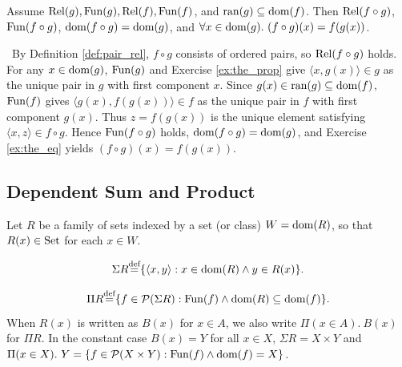 \documentclass[10pt,a4paper]{article}
\begin{document}
\begin{lemma}\label{lem:fun_comp}
Assume ${\textrm{Rel}}(g), {\textrm{Fun}}(g), {\textrm{Rel}}(f), {\textrm{Fun}}(f)$, and ${\textrm{ran}}(g) \subseteq {\textrm{dom}}(f)$. Then ${\textrm{Rel}}(f \circ g)$, ${\textrm{Fun}}(f \circ g)$, ${\textrm{dom}}(f \circ g) = {\textrm{dom}}(g)$, and $\forall x \in {\textrm{dom}}(g).\ (f \circ g)(x) = f(g(x))$.
\end{lemma}
\myprf\ By Definition \ref{def:pair_rel}, $f \circ g$ consists of ordered pairs, so ${\textrm{Rel}}(f \circ g)$ holds. For any $x \in {\textrm{dom}}(g)$, ${\textrm{Fun}}(g)$ and Exercise \ref{ex:the_prop} give $\langle x, g(x) \rangle \in g$ as the unique pair in $g$ with first component $x$. Since $g(x) \in {\textrm{ran}}(g) \subseteq {\textrm{dom}}(f)$, ${\textrm{Fun}}(f)$ gives $\langle g(x), f(g(x)) \rangle \in f$ as the unique pair in $f$ with first component $g(x)$. Thus $z = f(g(x))$ is the unique element satisfying $\langle x, z \rangle \in f \circ g$. Hence ${\textrm{Fun}}(f \circ g)$ holds, ${\textrm{dom}}(f \circ g) = {\textrm{dom}}(g)$, and Exercise \ref{ex:the_eq} yields $(f \circ g)(x) = f(g(x))$. \myqed

\subsection{Dependent Sum and Product}\label{sec:sigma_pi}
Let $R$ be a family of sets indexed by a set (or class) $W = {\textrm{dom}}(R)$, so that $R(x) \in {\textrm{Set}}$ for each $x \in W$.
\begin{definition}
$$\Sigma R {\stackrel{{\textrm{def}}}{=}} \{\langle x, y\rangle : x \in {\textrm{dom}}(R) \land y\in R(x)\}.$$
\end{definition}
\begin{definition}
$$\Pi R {\stackrel{{\textrm{def}}}{=}} \{ f\in {\mathcal{P}}(\Sigma R) : {\textrm{Fun}}(f) \land {\textrm{dom}}(R)\subseteq {\textrm{dom}}(f)\}.$$
When $R(x)$ is written as $B(x)$ for $x \in A$, we also write $\Pi(x \in A).\ B(x)$ for $\Pi R$. In the constant case $B(x) = Y$ for all $x \in X$, $\Sigma R = X \times Y$ and $\Pi(x \in X).\ Y = \{f \in {\mathcal{P}}(X \times Y) : {\textrm{Fun}}(f) \land {\textrm{dom}}(f) = X\}$.
\end{definition}
\end{document}
